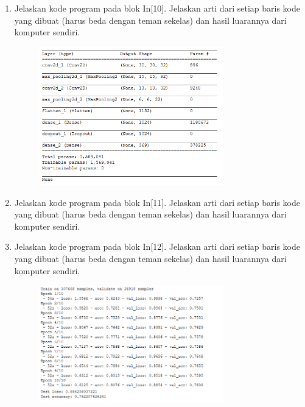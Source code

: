 \begin{enumerate}
	\item Jelaskan kode program pada blok  In[10]. Jelaskan arti dari setiap baris kode yang dibuat (harus beda dengan teman sekelas) dan hasil luarannya dari komputer sendiri.
	\hfill\break

	
	\begin{figure}[H]
		\includegraphics[width=8cm]{figures/1174006/chapter7/praktek/10.png}
		\centering
	\end{figure}

	\item Jelaskan kode program pada blok  In[11]. Jelaskan arti dari setiap baris kode yang dibuat (harus beda dengan teman sekelas) dan hasil luarannya dari komputer sendiri.
	\hfill\break

	

	\item Jelaskan kode program pada blok  In[12]. Jelaskan arti dari setiap baris kode yang dibuat (harus beda dengan teman sekelas) dan hasil luarannya dari komputer sendiri.
	\hfill\break

	
	\begin{figure}[H]
		\includegraphics[width=8cm]{figures/1174006/chapter7/praktek/12.png}
		\centering
	\end{figure}


\end{enumerate}
